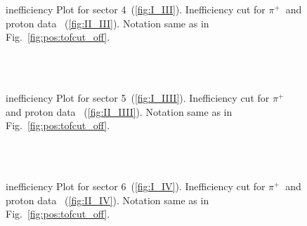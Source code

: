 \begin{figure}[!ht]
  \centering
   \quad
  \\
   \\

      \caption { inefficiency Plot for sector 4~(\ref{fig:I_III}). Inefficiency cut for $\pi^{+} \ $ and proton data ~(\ref{fig:II_III}). Notation same as in Fig.~\ref{fig:pos:tofcut_off}.}
        \label{fig:allI_III}
\end{figure}

\begin{figure}[!ht]
  \centering
   \quad
  \\
   \\

      \caption { inefficiency Plot for sector 5~(\ref{fig:I_IIII}). Inefficiency cut for $\pi^{+} \ $ and proton data ~(\ref{fig:II_IIII}). Notation same as in Fig.~\ref{fig:pos:tofcut_off}.}
        \label{fig:allI_IIII}
\end{figure}

\begin{figure}[!ht]
  \centering
   \quad
  \\
   \\

      \caption { inefficiency Plot for sector 6~(\ref{fig:I_IV}). Inefficiency cut for $\pi^{+} \ $ and proton data ~(\ref{fig:II_IV}). Notation same as in Fig.~\ref{fig:pos:tofcut_off}.}
        \label{fig:allI_IV}
\end{figure}



\FloatBarrier 


